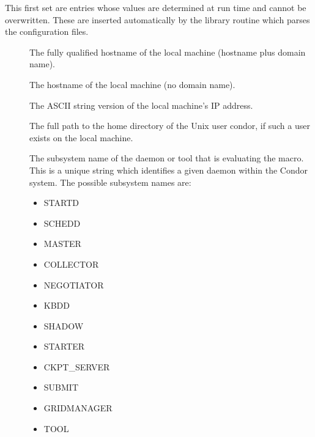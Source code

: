 This first set are entries whose values are determined at
run time and cannot be overwritten.  These are inserted automatically by
the library routine which parses the configuration files.
\begin{description}
  
\item[] \label{param:FullHostname}
  The
  fully qualified hostname of the local machine (hostname plus domain
  name).
  
\item[] \label{param:Hostname}
  The hostname of the local machine (no domain name).
  
\item[] \label{param:IpAddress}
  The ASCII string version of the local machine's IP address.

\item[] \label{param:Tilde}
  The full path to the
  home directory of the Unix user condor, if such a user exists on the
  local machine.

  \label{sec:Condor-Subsystem-Names}
\item[] \label{param:Subsystem}
  The subsystem
  name of the daemon or tool that is evaluating the macro.
  This is a unique string which identifies a given daemon within the
  Condor system.  The possible subsystem names are:

  \begin{itemize}
  \item STARTD
  \item SCHEDD
  \item MASTER
  \item COLLECTOR
  \item NEGOTIATOR
  \item KBDD 
  \item SHADOW
  \item STARTER
  \item CKPT\_SERVER
  \item SUBMIT
  \item GRIDMANAGER
  \item TOOL
    \label{list:subsystem names}
  \end{itemize}

\end{description}

